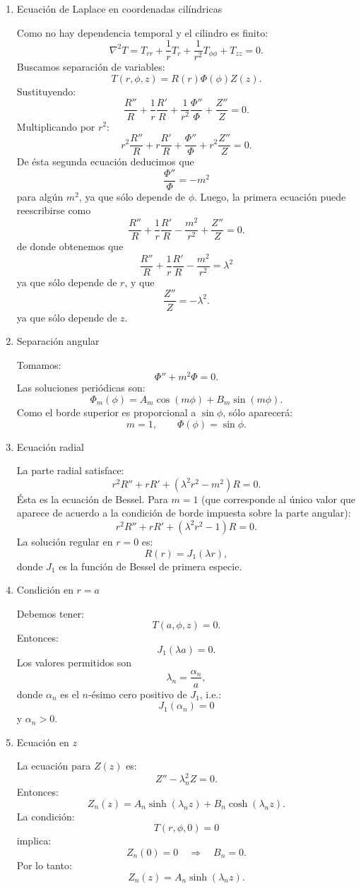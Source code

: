 \documentclass[11pt,spanish]{article}
\begin{document}
\begin{enumerate}
\item Ecuación de Laplace en coordenadas cilíndricas

Como no hay dependencia temporal y el cilindro es finito:
$$
\nabla^2 T
=
T_{rr}
+\frac1rT_r
+\frac1{r^2}T_{\phi\phi}
+T_{zz}
=0.
$$
Buscamos separación de variables:
$$
T(r,\phi,z)=R(r)\Phi(\phi)Z(z).
$$
Sustituyendo:
$$
\frac{R''}{R}
+\frac1r\frac{R'}{R}
+\frac1{r^2}\frac{\Phi''}{\Phi}
+\frac{Z''}{Z}=0.
$$
Multiplicando por $r^2$:
$$
r^2\frac{R''}{R}
+r\frac{R'}{R}
+\frac{\Phi''}{\Phi}
+r^2\frac{Z''}{Z}=0.
$$
De \'esta segunda ecuaci\'on deducimos que
$$
\frac{\Phi''}{\Phi}=-m^2
$$
para alg\'un $m^2$, ya que s\'olo depende de $\phi$.
Luego, la primera ecuaci\'on puede reescribirse como
$$
\frac{R''}{R}
+\frac1r\frac{R'}{R}
-\frac{m^2}{r^2}
+\frac{Z''}{Z}=0.
$$
de donde obtenemos que
$$
\frac{R''}{R}
+\frac1r\frac{R'}{R}
-\frac{m^2}{r^2}
=
\lambda^2
$$
ya que s\'olo depende de $r$, y que
$$
\frac{Z''}{Z}=-\lambda^2.
$$
ya que s\'olo depende de $z$.

\item Separación angular

Tomamos:
$$
\Phi''+m^2\Phi=0.
$$
Las soluciones periódicas son:
$$
\Phi_m(\phi)=
A_m\cos(m\phi)+B_m\sin(m\phi).
$$
Como el borde superior es proporcional a $\sin\phi$, sólo aparecerá:
$$
m=1,
\qquad
\Phi(\phi)=\sin\phi.
$$


\item Ecuación radial

La parte radial satisface:
$$
r^2R''+rR'+(\lambda^2 r^2-m^2)R=0.
$$
Ésta es la ecuación de Bessel.
Para $m=1$ (que corresponde al \'unico valor que aparece de acuerdo a la condici\'on de borde impuesta sobre la parte angular):
$$
r^2R''+rR'+(\lambda^2r^2-1)R=0.
$$
La solución regular en $r=0$ es:
$$
R(r)=J_1(\lambda r),
$$
donde $J_1$ es la función de Bessel de primera especie.

\item Condición en $r=a$

Debemos tener:
$$
T(a,\phi,z)=0.
$$
Entonces:
$$
J_1(\lambda a)=0.
$$
Los valores permitidos son
$$
\lambda_n=\frac{\alpha_n}{a},
$$
donde $\alpha_n$ es el $n$-ésimo cero positivo de $J_1$, i.e.:
$$
J_1(\alpha_n)=0
$$
y
$\alpha_n>0$.

\item Ecuación en $z$

La ecuación para $Z(z)$ es:
$$
Z''-\lambda_n^2 Z=0.
$$
Entonces:
$$
Z_n(z)=
A_n\sinh(\lambda_n z)
+
B_n\cosh(\lambda_n z).
$$
La condición:
$$
T(r,\phi,0)=0
$$
implica:
$$
Z_n(0)=0
\quad\Rightarrow\quad
B_n=0.
$$
Por lo tanto:
$$
Z_n(z)=A_n\sinh(\lambda_n z).
$$


\end{enumerate}
\end{document}
